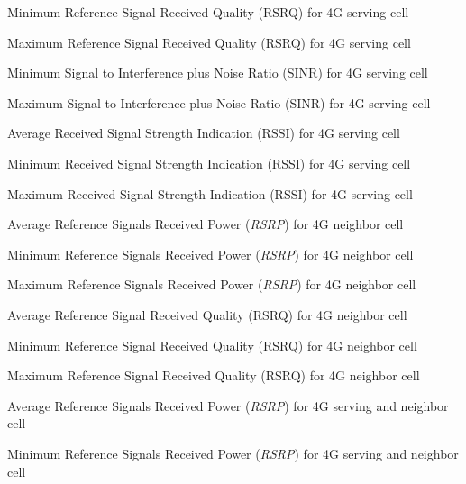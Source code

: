 %
{Minimum Reference Signal Received Quality (RSRQ) for 4G serving cell}

%
{Maximum Reference Signal Received Quality (RSRQ) for 4G serving cell}


%
{Minimum Signal to Interference plus Noise Ratio (SINR) for 4G serving cell}

%
{Maximum Signal to Interference plus Noise Ratio (SINR) for 4G serving cell}

%
{Average Received Signal Strength Indication (RSSI) for 4G serving cell}

%
{Minimum Received Signal Strength Indication (RSSI) for 4G serving cell}

%
{Maximum Received Signal Strength Indication (RSSI) for 4G serving cell}


%
{Average Reference Signals Received Power (\textit{RSRP}) for 4G neighbor cell}

%
{Minimum Reference Signals Received Power (\textit{RSRP}) for 4G neighbor cell}

%
{Maximum Reference Signals Received Power (\textit{RSRP}) for 4G neighbor cell}


%
{Average Reference Signal Received Quality (RSRQ) for 4G neighbor cell}

%
{Minimum Reference Signal Received Quality (RSRQ) for 4G neighbor cell}

%
{Maximum Reference Signal Received Quality (RSRQ) for 4G neighbor cell}


%
{Average Reference Signals Received Power (\textit{RSRP}) for 4G serving and neighbor cell}

%
{Minimum Reference Signals Received Power (\textit{RSRP}) for 4G serving and neighbor cell}

